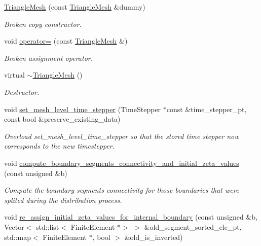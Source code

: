 \begin{DoxyCompactItemize}
\hyperlink{classoomph_1_1TriangleMesh_a2a6d680ea50dca34788f4f0c480d9d75}{Triangle\+Mesh} (const \hyperlink{classoomph_1_1TriangleMesh}{Triangle\+Mesh} \&dummy)
\begin{DoxyCompactList}\small\item\em Broken copy constructor. \end{DoxyCompactList}\item 
void \hyperlink{classoomph_1_1TriangleMesh_a246acfb459ba11cc8b21132ace403e3c}{operator=} (const \hyperlink{classoomph_1_1TriangleMesh}{Triangle\+Mesh} \&)
\begin{DoxyCompactList}\small\item\em Broken assignment operator. \end{DoxyCompactList}\item 
virtual \hyperlink{classoomph_1_1TriangleMesh_a1b3d8cb528c25a53faa38164600f256d}{$\sim$\+Triangle\+Mesh} ()
\begin{DoxyCompactList}\small\item\em Destructor. \end{DoxyCompactList}\item 
void \hyperlink{classoomph_1_1TriangleMesh_abb1a6cb242b5d0e067a8e64b3ac50cfb}{set\+\_\+mesh\+\_\+level\+\_\+time\+\_\+stepper} (Time\+Stepper $\ast$const \&time\+\_\+stepper\+\_\+pt, const bool \&preserve\+\_\+existing\+\_\+data)
\begin{DoxyCompactList}\small\item\em Overload set\+\_\+mesh\+\_\+level\+\_\+time\+\_\+stepper so that the stored time stepper now corresponds to the new timestepper. \end{DoxyCompactList}\item 
void \hyperlink{classoomph_1_1TriangleMesh_a18322e3238acaf2c0d3c473b5fac4c91}{compute\+\_\+boundary\+\_\+segments\+\_\+connectivity\+\_\+and\+\_\+initial\+\_\+zeta\+\_\+values} (const unsigned \&b)
\begin{DoxyCompactList}\small\item\em Compute the boundary segments connectivity for those boundaries that were splited during the distribution process. \end{DoxyCompactList}\item 
void \hyperlink{classoomph_1_1TriangleMesh_a614bf8ce3f64b37924a0b02fc5bab8eb}{re\+\_\+assign\+\_\+initial\+\_\+zeta\+\_\+values\+\_\+for\+\_\+internal\+\_\+boundary} (const unsigned \&b, Vector$<$ std\+::list$<$ Finite\+Element $\ast$$>$ $>$ \&old\+\_\+segment\+\_\+sorted\+\_\+ele\+\_\+pt, std\+::map$<$ Finite\+Element $\ast$, bool $>$ \&old\+\_\+is\+\_\+inverted)
$$
\end{DoxyCompactItemize}
